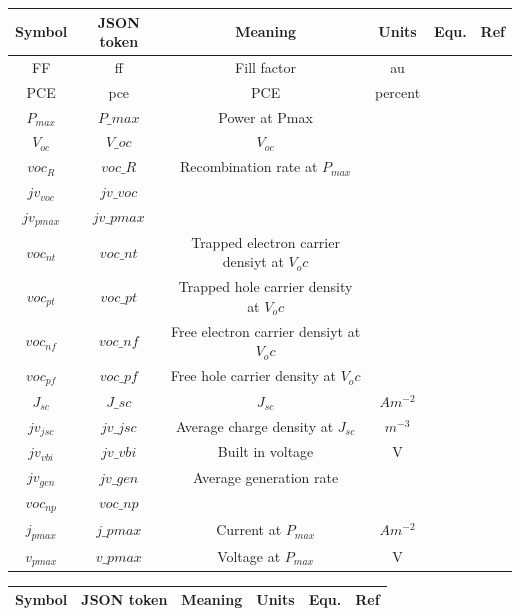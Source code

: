 \begin{landscape}
\begin{center}
\begin{tabular}{ |c|c|c|c| c| c|} 
\hline
Symbol & JSON token & Meaning & Units & Equ. & Ref \\
\hline
FF 				& ff 			& Fill factor										&au			&&\\
PCE 			& pce 			& PCE& percent										&			&\\
$P_{max}$ 		& $P\_{max}$ 	& Power at Pmax										&			&&\\
$V_{oc}$ 		& $V\_{oc}$ 		& $V_{oc}$ 										&			&&\\
$voc_{R}$ 		& $voc\_{R}$ 	& Recombination rate at $P_{max}$ 					&			& &\\
$jv_{voc}$  	& $jv\_{voc}$  	& 													&			&&\\
$jv_{pmax}$ 	& $jv\_{pmax}$ 	& 													&			&&\\
$voc_{nt}$ 		& $voc\_{nt}$ 	& Trapped electron carrier densiyt at $V_oc$		&			&&\\
$voc_{pt}$ 		& $voc\_{pt}$ 	& Trapped hole carrier density at $V_oc$			&			&&\\
$voc_{nf}$ 		& $voc\_{nf}$ 	& Free electron carrier densiyt at $V_oc$			&			&&\\
$voc_{pf}$ 		& $voc\_{pf}$ 	& Free hole carrier density at $V_oc$				&			&&\\
$J_{sc}$   		& $J\_{sc}$   	& $J_{sc}$											&$Am^{-2}$ 	& &\\
$jv_{jsc}$ 		& $jv\_{jsc}$ 	& Average charge density at $J_{sc}$				&$m^{-3}$ 	& &\\
$jv_{vbi}$ 		& $jv\_{vbi}$ 	& Built in voltage									& V			&&\\
$jv_{gen}$ 		& $jv\_{gen}$ 	& Average generation rate							&			&&\\
$voc_{np}$ 		& $voc\_{np}$ 	& 													&			&&\\
$j_{pmax}$ 		& $j\_{pmax}$ 	& Current at $P_{max}$								&$Am^{-2}$ 	& &\\
$v_{pmax}$ 		& $v\_{pmax}$ 	& Voltage at $P_{max}$    							&V			&  &\\
\hline
\end{tabular}
\end{center}

\begin{center}
\begin{tabular}{ |c|c|c|c| c| c|} 
\hline
Symbol & JSON token & Meaning & Units & Equ. & Ref \\
\hline


\end{tabular}
\end{center}
\end{landscape}
